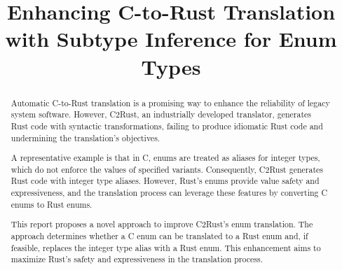 \documentclass[10pt,conference]{IEEEtran}
\begin{document}
\title{Enhancing C-to-Rust Translation with Subtype Inference for Enum Types}

\author{
}

\maketitle

\begin{abstract}


Automatic C-to-Rust translation is a promising way to enhance the reliability of legacy system software. However, C2Rust, an industrially developed translator, generates Rust code with
syntactic transformations, failing to produce idiomatic Rust code and undermining the translation's objectives.

A representative example is that in C, enums are treated as aliases for integer types, which do not enforce the values of specified variants. Consequently, C2Rust generates Rust code with integer type aliases. However, Rust's enums provide value safety and expressiveness, and the translation process can leverage these features by converting C enums to Rust enums.

This report proposes a novel approach to improve C2Rust's enum translation. The approach determines whether a C enum can be translated to a Rust enum and, if feasible, replaces the integer type alias with a Rust enum. This enhancement aims to maximize Rust's safety and expressiveness in the translation process.


\end{abstract}
\end{document}
